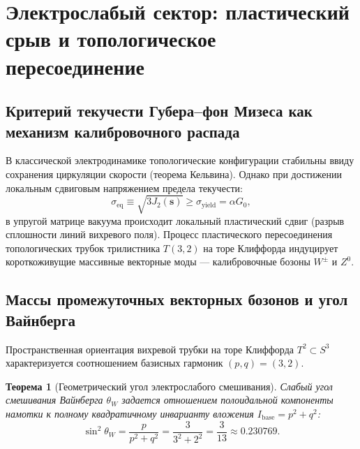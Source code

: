 \documentclass[12pt,a4paper]{article}
\newtheorem{theorem}{Теорема}[section]
\theoremstyle{definition}
\theoremstyle{remark}
\begin{document}

\section{Электрослабый сектор: пластический срыв и топологическое пересоединение}
\label{sec:electroweak}

\subsection{Критерий текучести Губера--фон Мизеса как механизм калибровочного распада}
В классической электродинамике топологические конфигурации стабильны ввиду сохранения циркуляции скорости (теорема Кельвина). Однако при достижении локальным сдвиговым напряжением предела текучести:
\begin{equation}
	\sigma_{\mathrm{eq}} \equiv \sqrt{3 J_2(\mathbf{s})} \ge \sigma_{\mathrm{yield}} = \alpha G_0,
	\label{eq:yield_condition}
\end{equation}
в упругой матрице вакуума происходит локальный пластический сдвиг (разрыв сплошности линий вихревого поля). Процесс пластического пересоединения топологических трубок трилистника $T(3,2)$ на торе Клиффорда индуцирует короткоживущие массивные векторные моды --- калибровочные бозоны $W^\pm$ и $Z^0$.

\subsection{Массы промежуточных векторных бозонов и угол Вайнберга}
Пространственная ориентация вихревой трубки на торе Клиффорда $T^2 \subset S^3$ характеризуется соотношением базисных гармоник $(p, q) = (3, 2)$.

\begin{theorem}[Геометрический угол электрослабого смешивания]
	Слабый угол смешивания Вайнберга $\theta_W$ задается отношением полоидальной компоненты намотки к полному квадратичному инварианту вложения $I_{\mathrm{base}} = p^2 + q^2$:
	\begin{equation}
		\sin^2\theta_W = \frac{p}{p^2 + q^2} = \frac{3}{3^2 + 2^2} = \frac{3}{13} \approx 0.230769.
		\label{eq:weinberg_angle_exact}
	\end{equation}
\end{theorem}
\end{document}
